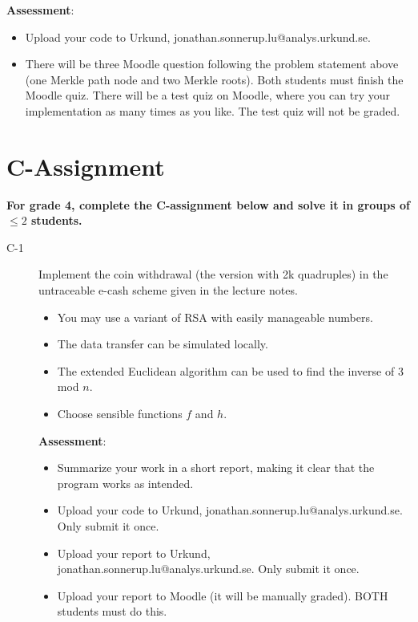 \documentclass{article}
\begin{document}
\begin{description}
		\textbf{Assessment}:
		\begin{itemize}
			\item Upload your code to Urkund, jonathan.sonnerup.lu@analys.urkund.se.
			\item There will be three Moodle question following the problem statement above (one Merkle path node and two Merkle roots). Both students must finish the Moodle quiz.	There will be a test quiz on Moodle, where you can try your implementation as many times as you like. The test quiz will not be graded.
		\end{itemize}
		
		
	\end{description}
	
	\clearpage
	
	\section*{C-Assignment}
	\textbf{For grade 4, complete the C-assignment below and solve it in groups of $\leq 2$ students.}
	
	\begin{description}
		\item[C-1]{Implement the coin withdrawal (the version with 2k quadruples) in the untraceable e-cash
			scheme given in the lecture notes.
			\begin{itemize}
				\item You may use a variant of RSA with easily manageable numbers.
				\item The data transfer can be simulated locally.
				\item The extended Euclidean algorithm can be used to find the inverse of 3 mod $n$.
				\item Choose sensible functions $f$ and $h$.
			\end{itemize}
			
			\textbf{Assessment}:
			\begin{itemize}
				\item Summarize your work in a short report, making it clear that the program works as intended.
				\item Upload your code to Urkund, jonathan.sonnerup.lu@analys.urkund.se. Only submit it once.
				\item Upload your report to Urkund, jonathan.sonnerup.lu@analys.urkund.se. Only submit it once.
				\item Upload your report to Moodle (it will be manually graded). BOTH students must do this.
			\end{itemize}
		}
	\end{description}
\end{document}
